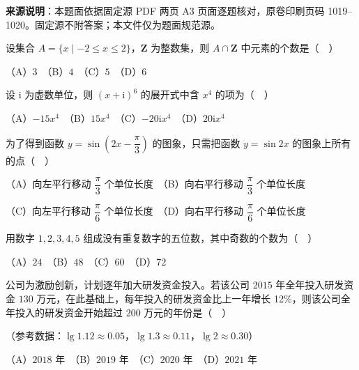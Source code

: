 


\begin{gktip}
\textbf{来源说明}：本题面依据固定源 PDF 两页 A3 页面逐题核对，原卷印刷页码 1019–1020。固定源不附答案；本文件仅为题面规范源。
\end{gktip}


\begin{question}
设集合 \(A=\{x\mid -2\leqslant x\leqslant 2\}\)，\(\mathbf{Z}\) 为整数集，则 \(A\cap\mathbf{Z}\) 中元素的个数是（　）

（A）\(3\)　（B）\(4\)　（C）\(5\)　（D）\(6\)

\end{question}
\begin{question}
设 \(\mathrm{i}\) 为虚数单位，则 \((x+\mathrm{i})^{6}\) 的展开式中含 \(x^{4}\) 的项为（　）

（A）\(-15x^{4}\)　（B）\(15x^{4}\)　（C）\(-20\mathrm{i}x^{4}\)　（D）\(20\mathrm{i}x^{4}\)

\end{question}
\begin{question}
为了得到函数 \(y=\sin\left(2x-\dfrac{\pi}{3}\right)\) 的图象，只需把函数 \(y=\sin 2x\) 的图象上所有的点（　）

（A）向左平行移动 \(\dfrac{\pi}{3}\) 个单位长度　（B）向右平行移动 \(\dfrac{\pi}{3}\) 个单位长度

（C）向左平行移动 \(\dfrac{\pi}{6}\) 个单位长度　（D）向右平行移动 \(\dfrac{\pi}{6}\) 个单位长度

\end{question}
\begin{question}
用数字 \(1,2,3,4,5\) 组成没有重复数字的五位数，其中奇数的个数为（　）

（A）\(24\)　（B）\(48\)　（C）\(60\)　（D）\(72\)

\end{question}
\begin{question}
公司为激励创新，计划逐年加大研发资金投入。若该公司 \(2015\) 年全年投入研发资金 \(130\) 万元，在此基础上，每年投入的研发资金比上一年增长 12\%，则该公司全年投入的研发资金开始超过 \(200\) 万元的年份是（　）

（参考数据：\(\lg 1.12\approx 0.05\)，\(\lg 1.3\approx 0.11\)，\(\lg 2\approx 0.30\)）

（A）\(2018\) 年　（B）\(2019\) 年　（C）\(2020\) 年　（D）\(2021\) 年

\Needspace{0.4\textheight}
\end{question}
